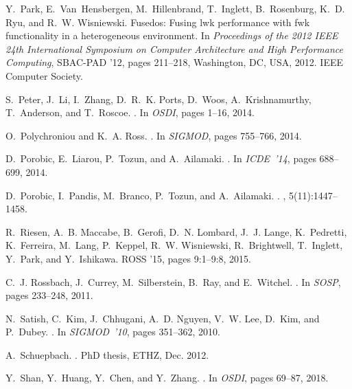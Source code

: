 \documentclass[11pt]{article}
\begin{document}
\begin{thebibliography}{10}
\begin{small}
Y.~Park, E.~Van~Hensbergen, M.~Hillenbrand, T.~Inglett, B.~Rosenburg, K.~D.
  Ryu, and R.~W. Wisniewski.
\newblock Fusedos: Fusing lwk performance with fwk functionality in a
  heterogeneous environment.
\newblock In {\em Proceedings of the 2012 IEEE 24th International Symposium on
  Computer Architecture and High Performance Computing}, SBAC-PAD '12, pages
  211--218, Washington, DC, USA, 2012. IEEE Computer Society.

S.~Peter, J.~Li, I.~Zhang, D.~R.~K. Ports, D.~Woos, A.~Krishnamurthy,
  T.~Anderson, and T.~Roscoe.
.
\newblock In {\em OSDI}, pages 1--16, 2014.

O.~Polychroniou and K.~A. Ross.
.
\newblock In {\em SIGMOD}, pages 755--766, 2014.

D.~Porobic, E.~Liarou, P.~Tozun, and A.~Ailamaki.
.
\newblock In {\em ICDE~'14}, pages 688--699, 2014.

D.~Porobic, I.~Pandis, M.~Branco, P.~Tozun, and A.~Ailamaki.
.
, 5(11):1447--1458.

R.~Riesen, A.~B. Maccabe, B.~Gerofi, D.~N. Lombard, J.~J. Lange, K.~Pedretti,
  K.~Ferreira, M.~Lang, P.~Keppel, R.~W. Wisniewski, R.~Brightwell, T.~Inglett,
  Y.~Park, and Y.~Ishikawa.
\newblock ROSS '15, pages 9:1--9:8, 2015.

C.~J. Rossbach, J.~Currey, M.~Silberstein, B.~Ray, and E.~Witchel.
.
\newblock In {\em SOSP}, pages 233--248, 2011.

N.~Satish, C.~Kim, J.~Chhugani, A.~D. Nguyen, V.~W. Lee, D.~Kim, and P.~Dubey.
.
\newblock In {\em SIGMOD~'10}, pages 351--362, 2010.

A.~Schuepbach.
.
\newblock PhD thesis, ETHZ, Dec. 2012.

Y.~Shan, Y.~Huang, Y.~Chen, and Y.~Zhang.
.
\newblock In {\em {OSDI}}, pages 69--87, 2018.


\end{small}
\end{thebibliography}
\end{document}
